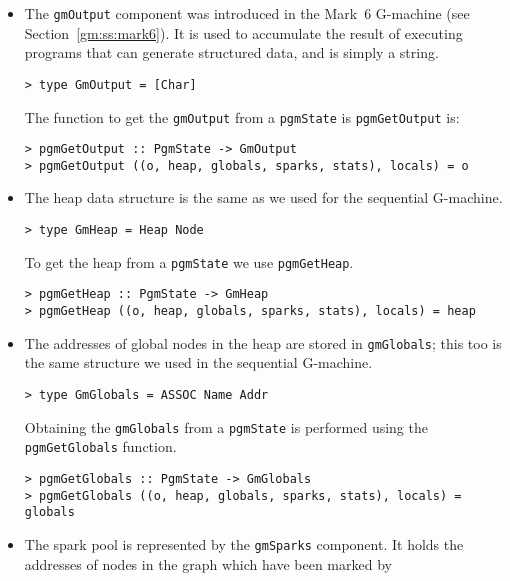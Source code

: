 \begin{itemize}

\item The \mbox{\tt gmOutput} component was introduced in the Mark~6 G-machine
(see Section~\ref{gm:ss:mark6}). It is used to accumulate the result of
executing programs that can generate structured data, and is simply a string.
\begin{verbatim}
> type GmOutput = [Char]
\end{verbatim}
%
The function to get the \mbox{\tt gmOutput} from a \mbox{\tt pgmState} is \mbox{\tt pgmGetOutput} is:
\begin{verbatim}
> pgmGetOutput :: PgmState -> GmOutput
> pgmGetOutput ((o, heap, globals, sparks, stats), locals) = o
\end{verbatim}
%
%
\item The heap data structure is the same as we used for the
sequential G-machine.
\begin{verbatim}
> type GmHeap = Heap Node
\end{verbatim}
%
To get the heap from a \mbox{\tt pgmState} we use \mbox{\tt pgmGetHeap}.
\begin{verbatim}
> pgmGetHeap :: PgmState -> GmHeap
> pgmGetHeap ((o, heap, globals, sparks, stats), locals) = heap
\end{verbatim}
%
%
\item The addresses of global nodes in the heap are stored in
\mbox{\tt gmGlobals}; this too is the same structure we used in the sequential
G-machine.
\begin{verbatim}
> type GmGlobals = ASSOC Name Addr
\end{verbatim}
%
Obtaining the \mbox{\tt gmGlobals} from a \mbox{\tt pgmState} is performed using the
\mbox{\tt pgmGetGlobals} function.
\begin{verbatim}
> pgmGetGlobals :: PgmState -> GmGlobals
> pgmGetGlobals ((o, heap, globals, sparks, stats), locals) = globals
\end{verbatim}
%
%
\item The spark pool is represented by the \mbox{\tt gmSparks} component. It
holds the addresses of nodes in the graph which have been marked by

\end{itemize}

